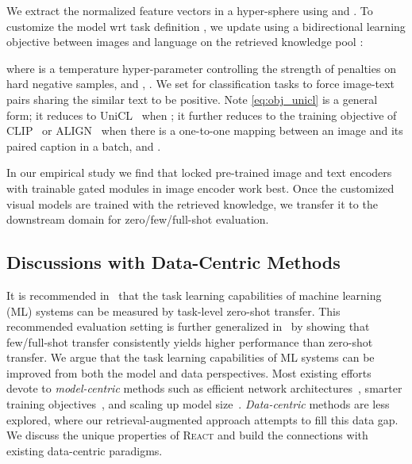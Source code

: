 \documentclass[10pt,twocolumn,letterpaper]{article}
\newcommand{\shortname}{\textsc{React}}
\begin{document}
We extract the normalized feature vectors in a hyper-sphere using  and . To customize the model wrt task definition , we update  using a bidirectional learning objective between images and language on the retrieved knowledge pool :

where  is a temperature hyper-parameter controlling the strength of penalties on hard negative samples, and , . We set  for classification tasks to force image-text pairs sharing the similar text to be positive. Note \eqref{eq:obj_unicl} is a general form; it  reduces to UniCL~\cite{yang2022unicl}  when ; it further reduces to the training objective of CLIP~\cite{radford2021learning} or ALIGN~\cite{jia2021scaling} when there is a one-to-one mapping between an image and its paired caption in a batch, \ie  and .

In our empirical study we find that locked pre-trained image and text encoders with trainable gated modules in image encoder work best. Once the customized visual models are trained with the retrieved knowledge, we transfer it to the downstream domain for zero/few/full-shot evaluation. 


\vspace{-1mm}
\subsection{Discussions with Data-Centric Methods}
\vspace{-1mm}
It is recommended in~\cite{radford2021learning} that the task learning capabilities of machine learning (ML) systems can be measured by task-level zero-shot transfer. This recommended evaluation setting is further generalized in~\cite{li2022elevater} by showing that few/full-shot transfer consistently yields higher performance than zero-shot transfer. We argue that the task learning capabilities of ML systems can be improved from both the model and data perspectives. Most existing efforts devote to {\it model-centric} methods such as efficient network architectures~\cite{yang2022focal}, smarter training objectives~\cite{yang2022unicl}, and scaling up model size~\cite{goyal2019scaling,yuan2021florence}. {\it Data-centric} methods are less explored, where our retrieval-augmented approach attempts to fill this data gap. We discuss the unique properties of \shortname{} and build the connections with existing data-centric paradigms.
\end{document}
